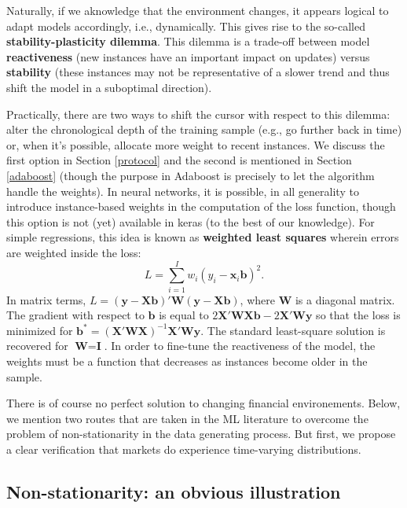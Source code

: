 \documentclass[]{krantz}
\theoremstyle{definition}
\theoremstyle{definition}
\theoremstyle{definition}
\theoremstyle{remark}
\begin{document}
Naturally, if we aknowledge that the environment changes, it appears
logical to adapt models accordingly, i.e., dynamically. This gives rise
to the so-called \textbf{stability-plasticity dilemma}. This dilemma is
a trade-off between model \textbf{reactiveness} (new instances have an
important impact on updates) versus \textbf{stability} (these instances
may not be representative of a slower trend and thus shift the model in
a suboptimal direction).

Practically, there are two ways to shift the cursor with respect to this
dilemma: alter the chronological depth of the training sample (e.g., go
further back in time) or, when it's possible, allocate more weight to
recent instances. We discuss the first option in Section \ref{protocol}
and the second is mentioned in Section \ref{adaboost} (though the
purpose in Adaboost is precisely to let the algorithm handle the
weights). In neural networks, it is possible, in all generality to
introduce instance-based weights in the computation of the loss
function, though this option is not (yet) available in keras (to the
best of our knowledge). For simple regressions, this idea is known as
\textbf{weighted least squares} wherein errors are weighted inside the
loss: \[L=\sum_{i=1}^Iw_i(y_i-\textbf{x}_i\textbf{b})^2.\] In matrix
terms,
\(L=(\textbf{y}-\textbf{Xb})'\textbf{W}(\textbf{y}-\textbf{Xb})\), where
\(\textbf{W}\) is a diagonal matrix. The gradient with respect to
\(\textbf{b}\) is equal to
\(2\textbf{X}'\textbf{WX}\textbf{b}-2\textbf{X}'\textbf{Wy}\) so that
the loss is minimized for
\(\textbf{b}^*=(\textbf{X}'\textbf{WX})^{-1}\textbf{X}'\textbf{Wy}\).
The standard least-square solution is recovered for
\(\textbf{W}=\textbf{I}\). In order to fine-tune the reactiveness of the
model, the weights must be a function that decreases as instances become
older in the sample.

There is of course no perfect solution to changing financial
environements. Below, we mention two routes that are taken in the ML
literature to overcome the problem of non-stationarity in the data
generating process. But first, we propose a clear verification that
markets do experience time-varying distributions.

\hypertarget{non-stationarity-an-obvious-illustration}{%
\subsection{Non-stationarity: an obvious
illustration}\label{non-stationarity-an-obvious-illustration}}
\end{document}
